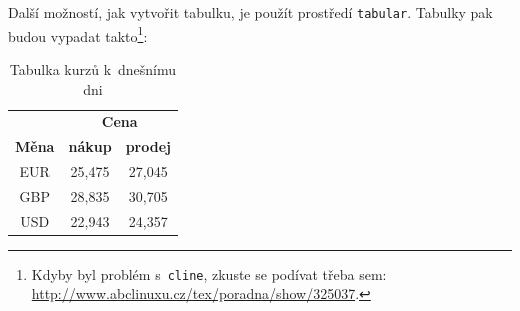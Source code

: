 \documentclass[a4paper, 11pt]{article}
\begin{document}
Další možností, jak vytvořit tabulku, je použít prostředí \texttt{tabular}. Tabulky pak budou vypadat takto\footnote{Kdyby byl problém s~\texttt{cline}, zkuste se podívat třeba sem: \href{http://www.abclinuxu.cz/tex/poradna/show/325037}{http://www.abclinuxu.cz/tex/poradna/show/325037}.}:

\shorthandoff{-}
\begin{table}[ht]
    \begin{center}
        \begin{tabular}{|c|c|c|}
            \hline
                          & \multicolumn{2}{c|}{\textbf{Cena}}                   \\ \cline{2-3}
            \textbf{Měna} & \textbf{nákup}                     & \textbf{prodej} \\ \hline
            EUR           & 25,475                             & 27,045          \\
            GBP           & 28,835                             & 30,705          \\
            USD           & 22,943                             & 24,357          \\ \hline
        \end{tabular}
        \label{TabulkaKurzu}
        \caption{Tabulka kurzů k~dnešnímu dni}\label{tab1}
    \end{center}
\end{table}
\end{document}
